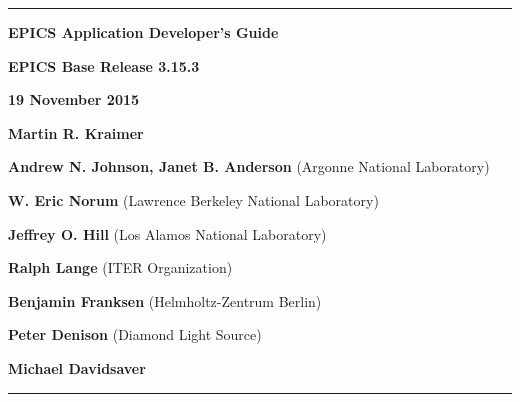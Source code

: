 \hrule

\vspace{1in}

\noindent \Huge \textbf{EPICS Application Developer's Guide}

\vspace{0.5in}

\noindent \Large \textbf{EPICS Base Release 3.15.3}

\noindent \textbf{19 November 2015}

\vspace{0.5in}

\normalsize
\noindent \textbf{Martin R. Kraimer}

\noindent \textbf{Andrew N. Johnson, Janet B. Anderson} (Argonne National Laboratory)

\noindent \textbf{W. Eric Norum} (Lawrence Berkeley National Laboratory)

\noindent \textbf{Jeffrey O. Hill} (Los Alamos National Laboratory)

\noindent \textbf{Ralph Lange} (ITER Organization)

\noindent \textbf{Benjamin Franksen} (Helmholtz-Zentrum Berlin)

\noindent \textbf{Peter Denison} (Diamond Light Source)

\noindent \textbf{Michael Davidsaver}

\vspace{1in}
\hrule
